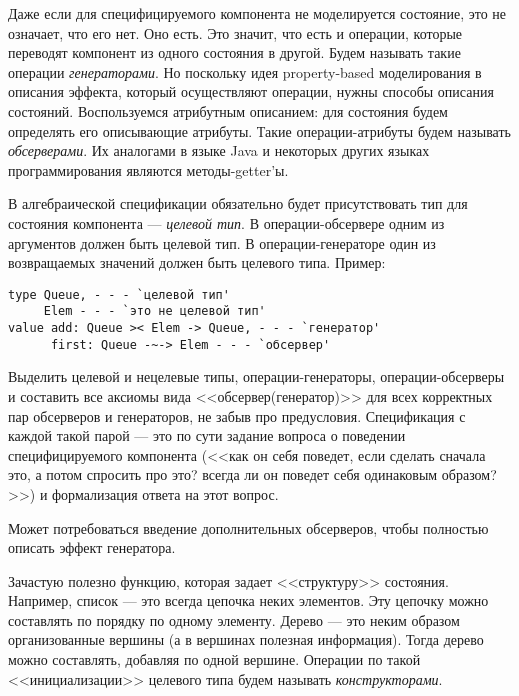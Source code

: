 
Даже если для специфицируемого компонента не моделируется состояние, это не означает, что его нет. Оно есть. Это значит, что есть и операции, которые переводят компонент из одного состояния в другой. Будем называть такие операции \emph{генераторами}. Но поскольку идея property-based моделирования в описания эффекта, который осуществляют операции, нужны способы описания состояний. Воспользуемся атрибутным описанием: для состояния будем определять его описывающие атрибуты. Такие операции-атрибуты будем называть \emph{обсерверами}. Их аналогами в языке Java и некоторых других языках программирования являются методы-getter'ы.

В алгебраической спецификации обязательно будет присутствовать тип для состояния компонента --- \emph{целевой тип}. В операции-обсервере одним из аргументов должен быть целевой тип. В операции-генераторе один из возвращаемых значений должен быть целевого типа. Пример:
\begin{lstlisting}[escapeinside=`']
type Queue, - - - `целевой тип'
     Elem - - - `это не целевой тип'
value add: Queue >< Elem -> Queue, - - - `генератор'
      first: Queue -~-> Elem - - - `обсервер'
\end{lstlisting}




Выделить целевой и нецелевые типы, операции-генераторы, операции-обсерверы и составить все аксиомы вида <<обсервер(генератор)>> для всех корректных пар обсерверов и генераторов, не забыв про предусловия. Спецификация с каждой такой парой --- это по сути задание вопроса о поведении специфицируемого компонента (<<как он себя поведет, если сделать сначала это, а потом спросить про это? всегда ли он поведет себя одинаковым образом?>>) и формализация ответа на этот вопрос.

Может потребоваться введение дополнительных обсерверов, чтобы полностью описать эффект генератора.


Зачастую полезно функцию, которая задает <<структуру>> состояния. Например, список --- это всегда цепочка неких элементов. Эту цепочку можно составлять по порядку по одному элементу. Дерево --- это неким образом организованные вершины (а в вершинах полезная информация). Тогда дерево можно составлять, добавляя по одной вершине. Операции по такой <<инициализации>> целевого типа будем называть \emph{конструкторами}.

